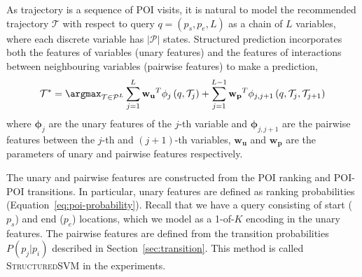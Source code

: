 {As trajectory is a sequence of POI visits,
it is natural to model the recommended trajectory $\mathcal{T}$ with respect to query $q = (p_s, p_e, L)$
as a chain of $L$ variables, where each discrete variable has $|\mathcal{P}|$ states.
Structured prediction incorporates both the features of variables (unary features) and
the features of interactions between neighbouring variables (pairwise features) to make a
prediction,
\begin{displaymath}
    \mathcal{T}^* = \argmax_{\mathcal{T} \in \mathcal{P}^L} 
                    \sum_{j=1}^L \mathbf{w_u}^T \mathbf{\phi}_j \left( q, \mathcal{T}_j \right) +
                    \sum_{j=1}^{L-1} \mathbf{w_p}^T \mathbf{\phi}_{j, j+1} \left( q, \mathcal{T}_j, \mathcal{T}_{j+1} \right)
\end{displaymath}
where $\mathbf{\phi}_j$ are the unary features of the $j$-th variable and $\mathbf{\phi}_{j, j+1}$ are the pairwise features between
the $j$-th and $(j+1)$-th variables, $\mathbf{w_u}$ and $\mathbf{w_p}$ are the
parameters of unary and pairwise features respectively.

The unary and pairwise features are constructed from the POI ranking and POI-POI transitions.
In particular, unary features are defined as ranking probabilities (Equation~\ref{eq:poi-probability}).
Recall that we have a query consisting of start ($p_s$) and end ($p_e$) locations, which
we model as a 1-of-$K$ encoding in the unary features.
The pairwise features are defined from the transition probabilities $P(p_j | p_i)$ described in
Section~\ref{sec:transition}.
This method is called \textsc{StructuredSVM} in the experiments.

}
